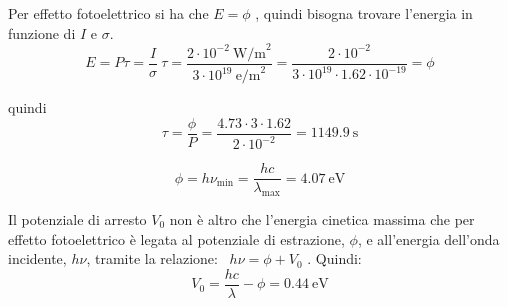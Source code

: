 \documentclass[12pt,twoside,a4]{article}
\begin{document}
\begin{solution}
	Per effetto fotoelettrico si ha che $E = \phi$ , quindi bisogna trovare l'energia in funzione di $I$ e $\sigma$.
 \begin{equation*}
    E = P \tau = \frac{I}{\sigma} \ \tau = \frac{2 \cdot 10^{-2} \ \mathrm{W/m}^2}{ 3\cdot 10^{19} \ \mathrm{e/m}^2} = \frac{2 \cdot 10^{-2}}{3 \cdot 10^{19} \cdot 1.62 \cdot 10^{-19}} = \phi  
 \end{equation*}
 
 quindi \begin{equation*}
     \tau = \frac{\phi}{P} = \frac{4.73 \cdot 3 \cdot 1.62}{2 \cdot 10^{-2}} = 1149.9 \ \mathrm{s} 
 \end{equation*}
\end{solution}


\newpage
\begin{solution}
	\begin{equation*}
     \phi = h \nu_{\mathrm{min}} = \frac{hc}{\lambda_{\mathrm{max}}} = 4.07 \ \mathrm{eV} 
 \end{equation*}
\end{solution}



\begin{solution}
	Il potenziale di arresto $V_0$ non è altro che l'energia cinetica massima che per effetto fotoelettrico è legata al potenziale di estrazione, $\phi$, e all'energia dell'onda incidente, $h\nu$, tramite la relazione: \ $h\nu = \phi + V_0$ . Quindi: \begin{equation*}
     V_0 = \frac{hc}{\lambda} - \phi = 0.44 \ \mathrm{eV} 
 \end{equation*}
\end{solution}


\newpage
\end{document}
